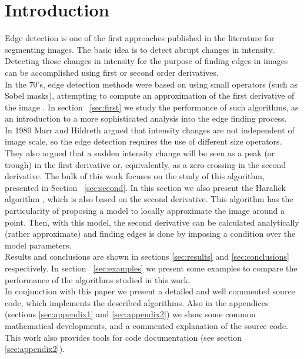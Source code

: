 \documentclass{ipol}
\numberwithin{equation}{section}
\numberwithin{table}{section}
\numberwithin{figure}{section}
\begin{document}
\section{Introduction}
\label{sec:intro}

Edge detection is one of the first approaches published in the literature for 
segmenting images. The basic idea is to detect abrupt changes in intensity. 
Detecting those changes in intensity for the purpose of finding edges in images 
can be accomplished using first or second order derivatives. \\

In the 70's, edge detection methods were based on using small operators 
(such as Sobel masks), attempting to compute an approximation of the
first derivative of the image \cite{Gonzalez2007Digital}. In section ~\ref{sec:first} we study the 
performance of such algorithms, as an introduction to a more sophisticated 
analysis into the edge finding process.\\

In 1980 Marr and Hildreth \cite{AIM-518} argued that intensity changes are not independent 
of image scale, so the edge detection requires the use of different size 
operators. They also argued that a sudden intensity change will be seen 
as a peak (or trough) in the first derivative or, equivalently, as a zero 
crossing in the second derivative. The bulk of this work focuses on the 
study of this algorithm, presented in Section ~\ref{sec:second}. In this section 
we also present the Haralick algorithm \cite{bb20239}, which is also based on the second derivative.
This algorithm has the particularity of proposing a model to locally approximate 
the image around a point. Then, with this model, the second derivative can be calculated 
analytically (rather approximate) and finding edges is done by imposing a 
condition over the model parameters. \\

Results and conclusions are shown in sections \ref{sec:results} and 
\ref{sec:conclusions} respectively. In section ~\ref{sec:examples} we present some examples to compare the 
performance of the algorithms studied in this work. \\

In conjunction with this paper we present a detailed and well commented source code, which 
implements the described algorithms. Also in the appendices (sections \ref{sec:appendix1} 
and \ref{sec:appendix2}) we show some common mathematical developments, and a commented 
explanation of the source code. This work also provides tools for code documentation 
(see section \ref{sec:appendix2}). \\
\end{document}
